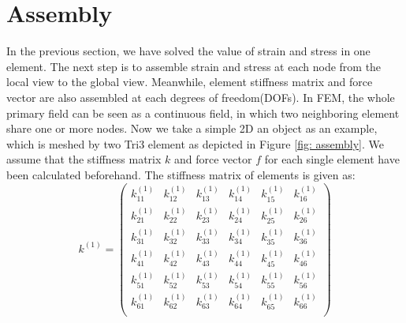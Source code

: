 \section{Assembly}
In the previous section, we have solved the value of strain and stress in one element. The next step is to assemble strain and stress at each node from the local view to the global view. Meanwhile, element stiffness matrix and force vector are also assembled at each degrees of freedom(DOFs). In FEM, the whole primary field can be seen as a continuous field, in which two neighboring element share one or more nodes. Now we take a simple 2D an object as an example, which is meshed by two Tri3 element as depicted in Figure \ref{fig: assembly}. We assume that the stiffness matrix $k$ and force vector $f$ for each single element have been calculated beforehand. The stiffness matrix of elements is given as:
\begin{equation} \label{eq: k_1}
k^{\left(1\right)} = \begin{pmatrix}
k_{11}^{\left(1\right)} & k_{12}^{\left(1\right)} &  k_{13}^{\left(1\right)} &  k_{14}^{\left(1\right)} & k_{15}^{\left(1\right)}  & k_{16}^{\left(1\right)}   \\[0.3em]
k_{21}^{\left(1\right)} & k_{22}^{\left(1\right)} &  k_{23}^{\left(1\right)} &  k_{24}^{\left(1\right)} & k_{25}^{\left(1\right)}  & k_{26}^{\left(1\right)}   \\[0.3em]
k_{31}^{\left(1\right)} & k_{32}^{\left(1\right)} &  k_{33}^{\left(1\right)} &  k_{34}^{\left(1\right)} & k_{35}^{\left(1\right)}  & k_{36}^{\left(1\right)}   \\[0.3em]
k_{41}^{\left(1\right)} & k_{42}^{\left(1\right)} &  k_{43}^{\left(1\right)} &  k_{44}^{\left(1\right)} & k_{45}^{\left(1\right)}  & k_{46}^{\left(1\right)}   \\[0.3em]
k_{51}^{\left(1\right)} & k_{52}^{\left(1\right)} &  k_{53}^{\left(1\right)} &  k_{54}^{\left(1\right)} & k_{55}^{\left(1\right)}  & k_{56}^{\left(1\right)}   \\[0.3em]
k_{61}^{\left(1\right)} & k_{62}^{\left(1\right)} &  k_{63}^{\left(1\right)} &  k_{64}^{\left(1\right)} & k_{65}^{\left(1\right)}  & k_{66}^{\left(1\right)}   \\[0.3em]
\end{pmatrix} 
\end{equation}	

